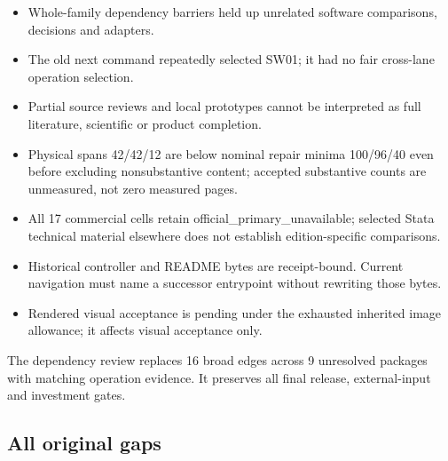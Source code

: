 \documentclass[
  10pt,
]{article}
\providecommand{\tightlist}{%
  \setlength{\itemsep}{0pt}\setlength{\parskip}{0pt}}
\begin{document}
\begin{itemize}
\tightlist
\item
  Whole-family dependency barriers held up unrelated software
  comparisons, decisions and adapters.
\item
  The old next command repeatedly selected SW01; it had no fair
  cross-lane operation selection.
\item
  Partial source reviews and local prototypes cannot be interpreted as
  full literature, scientific or product completion.
\item
  Physical spans 42/42/12 are below nominal repair minima 100/96/40 even
  before excluding nonsubstantive content; accepted substantive counts
  are unmeasured, not zero measured pages.
\item
  All 17 commercial cells retain official\_\allowbreak{}primary\_\allowbreak{}unavailable;
  selected Stata technical material elsewhere does not establish
  edition-specific comparisons.
\item
  Historical controller and README bytes are receipt-bound. Current
  navigation must name a successor entrypoint without rewriting those
  bytes.
\item
  Rendered visual acceptance is pending under the exhausted inherited
  image allowance; it affects visual acceptance only.
\end{itemize}

The dependency review replaces 16 broad edges across 9 unresolved
packages with matching operation evidence. It preserves all final
release, external-input and investment gates.

\hypertarget{all-original-gaps}{%
\subsection{All original gaps}\label{all-original-gaps}}
\end{document}
